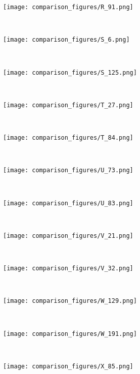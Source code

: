 \documentclass[conference]{IEEEtran}
\begin{document}
\begin{figure*}[!htbp]
\begin{subfigure}[b]{0.15\textwidth}
        \texttt{[image: comparison\_figures/R\_91.png]}
    \end{subfigure}
    ~
    \begin{subfigure}[b]{0.15\textwidth}
        \texttt{[image: comparison\_figures/S\_6.png]}
    \end{subfigure}
    ~
    \begin{subfigure}[b]{0.15\textwidth}
        \texttt{[image: comparison\_figures/S\_125.png]}
    \end{subfigure}
    ~
    \begin{subfigure}[b]{0.15\textwidth}
        \texttt{[image: comparison\_figures/T\_27.png]}
    \end{subfigure}
    ~
    \begin{subfigure}[b]{0.15\textwidth}
        \texttt{[image: comparison\_figures/T\_84.png]}
    \end{subfigure}
    ~
    \begin{subfigure}[b]{0.15\textwidth}
        \texttt{[image: comparison\_figures/U\_73.png]}
    \end{subfigure}
    ~
    \begin{subfigure}[b]{0.15\textwidth}
        \texttt{[image: comparison\_figures/U\_83.png]}
    \end{subfigure}
    ~
    \begin{subfigure}[b]{0.15\textwidth}
        \texttt{[image: comparison\_figures/V\_21.png]}
    \end{subfigure}
    ~
    \begin{subfigure}[b]{0.15\textwidth}
        \texttt{[image: comparison\_figures/V\_32.png]}
    \end{subfigure}
    ~
    \begin{subfigure}[b]{0.15\textwidth}
        \texttt{[image: comparison\_figures/W\_129.png]}
    \end{subfigure}
    ~
    \begin{subfigure}[b]{0.15\textwidth}
        \texttt{[image: comparison\_figures/W\_191.png]}
    \end{subfigure}
    ~
    \begin{subfigure}[b]{0.15\textwidth}
        \texttt{[image: comparison\_figures/X\_85.png]}
    \end{subfigure}
    ~
    \begin{subfigure}[b]{0.15\textwidth}

\end{subfigure}
\end{figure*}
\end{document}
